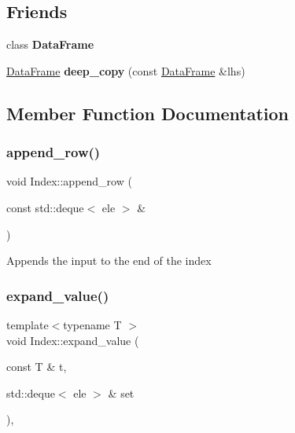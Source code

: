 \subsection*{Friends}
\begin{DoxyCompactItemize}
\item 
\mbox{\label{classIndex_ac3cf826bc43b8ab4740915b5c60e7166}} 
class {\bfseries Data\+Frame}
\item 
\mbox{\label{classIndex_ac665e1df1c1d41e0d0c5afcdfb827a74}} 
\hyperlink{classDataFrame}{Data\+Frame} {\bfseries deep\+\_\+copy} (const \hyperlink{classDataFrame}{Data\+Frame} \&lhs)
\end{DoxyCompactItemize}


\subsection{Member Function Documentation}
\mbox{\label{classIndex_ac3789b237b8cebc11d67e255cb25d6c6}} 
\subsubsection{\texorpdfstring{append\+\_\+row()}{append\_row()}}
{\footnotesize\ttfamily void Index\+::append\+\_\+row (\begin{DoxyParamCaption}\item[{const std\+::deque$<$ ele $>$ \&}]{ }\end{DoxyParamCaption})}

Appends the input to the end of the index \mbox{\label{classIndex_a5089996517fe6b536d141ffa46436a11}} 
\subsubsection{\texorpdfstring{expand\+\_\+value()}{expand\_value()}}
{\footnotesize\ttfamily template$<$typename T $>$ \\
void Index\+::expand\+\_\+value (\begin{DoxyParamCaption}\item[{const T \&}]{t,  }\item[{std\+::deque$<$ ele $>$ \&}]{set }\end{DoxyParamCaption})\hspace{0.3cm}{\ttfamily [inline]}, {\ttfamily [private]}}

